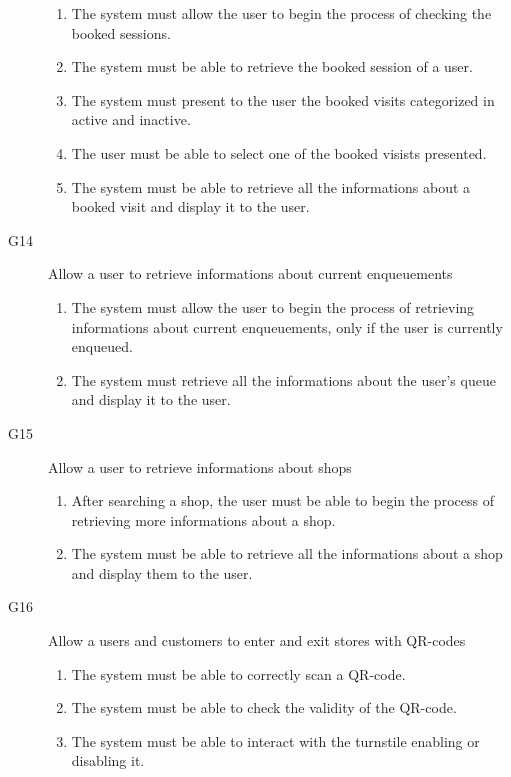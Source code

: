\begin{description}
        \begin{enumerate}[resume*]
            \item The system must allow the user to begin the process of checking the booked sessions.
            \item The system must be able to retrieve the booked session of a user.
            \item The system must present to the user the booked visits categorized in active and inactive.
            \item The user must be able to select one of the booked visists presented.
            \item The system must be able to retrieve all the informations about a booked visit and display it to the user.
        \end{enumerate}
    \item [G14] Allow a user to retrieve informations about current enqueuements
        \begin{enumerate}[resume*]
            \item The system must allow the user to begin the process of retrieving informations about current enqueuements, only if the user is currently enqueued.
            \item The system must retrieve all the informations about the user's queue and display it to the user.
        \end{enumerate}
    \item [G15] Allow a user to retrieve informations about shops 
        \begin{enumerate}[resume*]
            \item After searching a shop, the user must be able to begin the process of retrieving more informations about a shop.
            \item The system must be able to retrieve all the informations about a shop and display them to the user.
        \end{enumerate}
    \item [G16] Allow a users and customers to enter and exit stores with QR-codes
        \begin{enumerate}[resume*]
            \item The system must be able to correctly scan a QR-code.
            \item The system must be able to check the validity of the QR-code.
            \item The system must be able to interact with the turnstile enabling or disabling it.

\end{enumerate}
\end{description}
